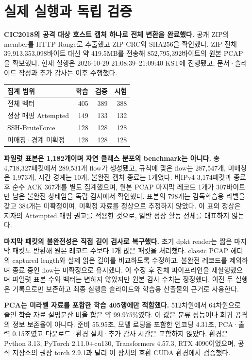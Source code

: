 \section{실제 실행과 독립 검증}
\textbf{CIC2018의 공격 대상 호스트 캡처 하나로 전체 변환을 완료했다.} 공개 ZIP의  member를 HTTP Range로 추출했고 ZIP CRC와 SHA256을 확인했다. ZIP 전체 39,913,353,098바이트 대신 약 419.5MB를 전송해 852,795,392바이트의 원본 PCAP을 확보했다. 현재 실행은 2026-10-29 21:08:39--21:09:40 KST에 진행됐고, 문서·슬라이드 작성과 추가 감사는 이후 수행했다.

\begin{tabularx}{\linewidth}{lrrr}
\toprule 집계 범위 & 학습 & 검증 & 시험\\\midrule
전체 벡터 & 405 & 389 & 388\\
정상 매핑 Attempted & 149 & 133 & 132\\
SSH-BruteForce & 128 & 128 & 128\\
미매칭·경계 미확정 & 128 & 128 & 128\\\bottomrule
\end{tabularx}
\textbf{파일럿 표본은 1,182개이며 자연 클래스 분포의 benchmark는 아니다.} 총 4,718,327패킷에서 289,531개 flow가 생성됐고, 규칙에 맞은 flow는 287,547개, 미매칭은 1,973개, 시간 경계는 10개, 불완전 캡처 종료는 1개였다. 비IPv4 3,174패킷과 종료 후 순수 ACK 367개를 별도 집계했으며, 원본 PCAP 마지막 레코드 1개가 307바이트만 남은 불완전 상태임을 독립 검사에서 확인했다. 표본의 798개는 감독학습용 라벨을 갖고 384개는 미확정이며, 미확정 자료를 정상으로 추정하지 않았다. 이 표의 정상은 저자의 Attempted 매핑 권고를 적용한 것으로, 일반 정상 활동 전체를 대표하지 않는다.

\textbf{마지막 패킷의 불완전성은 직접 길이 검사로 복구했다.} 초기 dpkt reader는 짧은 마지막 패킷도 반환해 원본 레코드 수보다 1개 많은 패킷을 처리했다. classic PCAP 헤더의 captured length와 실제 읽은 길이를 비교하도록 수정하고, 불완전 레코드를 제외하며 종료 중인 flow는 미확정으로 유지했다. 이 수정 후 전체 파이프라인을 재실행했으며 파일럿 표본 수와 벡터는 변하지 않았지만 원본 감사 수치는 정정했다. 이전 두 실행은 기록으로만 보존하고 최종 실행을 슬라이드와 학습용 산출물의 근거로 사용한다.

\textbf{PCA는 미라벨 자료를 포함한 학습 405행에만 적합했다.} 512차원에서 64차원으로 줄인 학습 자료 설명분산 비율 합은 약 99.975\%였다. 이 값은 분류 성능이나 희귀 공격의 정보 보존율이 아니다. 준비 55.95초, 모델 로딩을 포함한 인코딩 4.31초, PCA·출력 0.15초였고 다운로드·환경 설치·추가 감사 시간은 포함하지 않았다. 환경은 Python 3.13, PyTorch 2.11.0+cu130, Transformers 4.57.3, RTX 4090이었으며, 공식 저장소의 권장 torch 2.9.1과 달리 이 장치의 호환 CUDA 환경에서 검증했다.

